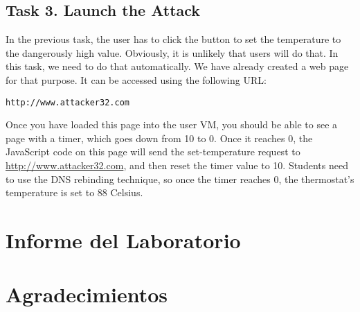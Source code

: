 \subsection{Task 3. Launch the Attack}

In the previous task, the user has to click the button to set the 
temperature to the dangerously high value. Obviously, it is unlikely that users will 
do that.  In this task, we need to do that automatically. We have already created 
a web page for that purpose. It can be accessed using the following URL:


\begin{lstlisting}
http://www.attacker32.com
\end{lstlisting}
 

Once you have loaded this page into the user VM, you should be able to see a page with a 
timer, which goes down from 10 to 0. Once it reaches 0, the JavaScript code 
on this page will send the set-temperature request to 
\url{http://www.attacker32.com}, and then reset the timer value to 10. 
Students need to use the DNS rebinding technique, so
once the timer reaches 0, the thermostat's temperature is set to 
88 Celsius. 



\section{Informe del Laboratorio}



\section*{Agradecimientos}






